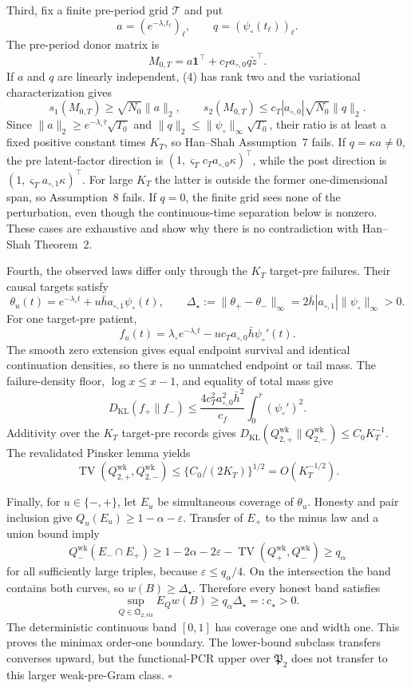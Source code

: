 Third, fix a finite pre-period grid \(\mathcal T\) and put
\[
 a=(e^{-\lambda_\circ t_\ell})_\ell,
 \qquad q=(\psi_\circ(t_\ell))_\ell.
\]
The pre-period donor matrix is
\[
 M_{0,T}=a\mathbf1^\top+c_Ta_{\circ,0}q\widetilde z^\top. \tag{4}
\]
If \(a\) and \(q\) are linearly independent, (4) has rank two and the variational characterization gives
\[
 s_1(M_{0,T})\ge\sqrt{N_0}\|a\|_2,
 \qquad s_2(M_{0,T})\le c_T|a_{\circ,0}|\sqrt{N_0}\|q\|_2. \tag{5}
\]
Since \(\|a\|_2\ge e^{-\lambda_\circ\bar\tau}\sqrt{T_0}\) and \(\|q\|_2\le\|\psi_\circ\|_\infty\sqrt{T_0}\), their ratio is at least a fixed positive constant times \(K_T\), so Han--Shah Assumption~7 fails. If \(q=\kappa a\ne0\), the pre latent-factor direction is \((1,\varsigma_Tc_Ta_{\circ,0}\kappa)^\top\), while the post direction is \((1,\varsigma_Ta_{\circ,1}\kappa)^\top\). For large \(K_T\) the latter is outside the former one-dimensional span, so Assumption~8 fails. If \(q=0\), the finite grid sees none of the perturbation, even though the continuous-time separation below is nonzero. These cases are exhaustive and show why there is no contradiction with Han--Shah Theorem~2.

Fourth, the observed laws differ only through the \(K_T\) target-pre failures. Their causal targets satisfy
\[
 \theta_u(t)=e^{-\lambda_\circ t}+u\bar h a_{\circ,1}\psi_\circ(t),
 \qquad
 \Delta_\star:=\|\theta_+-\theta_-\|_\infty
 =2\bar h|a_{\circ,1}|\|\psi_\circ\|_\infty>0.        \tag{6}
\]
For one target-pre patient,
\[
 f_u(t)=\lambda_\circ e^{-\lambda_\circ t}
 -u c_Ta_{\circ,0}\bar h\psi_\circ'(t).                 \tag{7}
\]
The smooth zero extension gives equal endpoint survival and identical continuation densities, so there is no unmatched endpoint or tail mass. The failure-density floor, \(\log x\le x-1\), and equality of total mass give
\[
 D_{\mathrm{KL}}(f_+\|f_-)
 \le\frac{4c_T^2a_{\circ,0}^2\bar h^2}{c_f}
 \int_0^{\bar\tau}(\psi_\circ')^2.                     \tag{8}
\]
Additivity over the \(K_T\) target-pre records gives \(D_{\mathrm{KL}}(Q_{2,+}^{\mathrm{wk}}\|Q_{2,-}^{\mathrm{wk}})\le C_0K_T^{-1}\). The revalidated Pinsker lemma yields
\[
 \operatorname{TV}(Q_{2,+}^{\mathrm{wk}},Q_{2,-}^{\mathrm{wk}})
 \le\{C_0/(2K_T)\}^{1/2}=O(K_T^{-1/2}).                 \tag{9}
\]

Finally, for \(u\in\{-,+\}\), let \(E_u\) be simultaneous coverage of \(\theta_u\). Honesty and pair inclusion give \(Q_u(E_u)\ge1-\alpha-\varepsilon\). Transfer of \(E_+\) to the minus law and a union bound imply
\[
 Q_-^{\mathrm{wk}}(E_-\cap E_+)
 \ge1-2\alpha-2\varepsilon-
 \operatorname{TV}(Q_+^{\mathrm{wk}},Q_-^{\mathrm{wk}})
 \ge q_\alpha                                             \tag{10}
\]
for all sufficiently large triples, because \(\varepsilon\le q_\alpha/4\). On the intersection the band contains both curves, so \(w(B)\ge\Delta_\star\). Therefore every honest band satisfies
\[
 \sup_{Q\in\mathfrak Q_{2,\mathrm{vis}}}E_Qw(B)
 \ge q_\alpha\Delta_\star=:c_\star>0.                 \tag{11}
\]
The deterministic continuous band \([0,1]\) has coverage one and width one. This proves the minimax order-one boundary. The lower-bound subclass transfers converses upward, but the functional-PCR upper over \(\mathfrak P_2\) does not transfer to this larger weak-pre-Gram class. \(\square\)